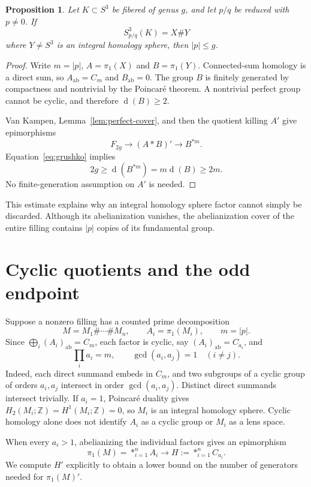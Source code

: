 \documentclass[11pt]{article}
\newtheorem{proposition}[theorem]{Proposition}
\theoremstyle{remark}
\newcommand{\Z}{\mathbb Z}
\newcommand{\ab}{\mathrm{ab}}
\newcommand{\gen}{\operatorname{d}}
\begin{document}
\begin{proposition}\label{prop:homology-sphere}
Let $K\subset S^3$ be fibered of genus $g$, and let $p/q$ be reduced with $p\ne0$. If
\[
 S^3_{p/q}(K)=X\#Y
\]
where $Y\ne S^3$ is an integral homology sphere, then $|p|\leq g$.
\end{proposition}
\begin{proof}
Write $m=|p|$, $A=\pi_1(X)$ and $B=\pi_1(Y)$. Connected-sum homology is a direct sum, so $A_{\ab}=C_m$ and $B_{\ab}=0$. The group $B$ is finitely generated by compactness and nontrivial by the Poincar\'e theorem. A nontrivial perfect group cannot be cyclic, and therefore $\gen(B)\geq2$.

Van Kampen, Lemma~\ref{lem:perfect-cover}, and then the quotient killing $A'$ give epimorphisms
\[
 F_{2g}\longrightarrow (A*B)'\longrightarrow B^{*m}.
\]
Equation~\eqref{eq:grushko} implies
\[
 2g\geq\gen(B^{*m})=m\gen(B)\geq2m.
\]
No finite-generation assumption on $A'$ is needed.
\end{proof}

This estimate explains why an integral homology sphere factor cannot simply be discarded. Although its abelianization vanishes, the abelianization cover of the entire filling contains $|p|$ copies of its fundamental group.

\section{Cyclic quotients and the odd endpoint}\label{sec:endpoint}

Suppose a nonzero filling has a counted prime decomposition
\begin{equation}\label{eq:sum}
 M=M_1\#\cdots\#M_n,
 \qquad A_i=\pi_1(M_i),\qquad m=|p|.
\end{equation}
Since $\bigoplus_i(A_i)_{\ab}=C_m$, each factor is cyclic, say $(A_i)_{\ab}=C_{a_i}$, and
\begin{equation}\label{eq:orders}
 \prod_i a_i=m,\qquad \gcd(a_i,a_j)=1\quad(i\ne j).
\end{equation}
Indeed, each direct summand embeds in $C_m$, and two subgroups of a cyclic group of orders $a_i,a_j$ intersect in order $\gcd(a_i,a_j)$. Distinct direct summands intersect trivially. If $a_i=1$, Poincar\'e duality gives $H_2(M_i;\Z)=H^1(M_i;\Z)=0$, so $M_i$ is an integral homology sphere. Cyclic homology alone does not identify $A_i$ as a cyclic group or $M_i$ as a lens space.

When every $a_i>1$, abelianizing the individual factors gives an epimorphism
\[
 \pi_1(M)=*_{i=1}^n A_i\longrightarrow H:=*_{i=1}^n C_{a_i}.
\]
We compute $H'$ explicitly to obtain a lower bound on the number of generators needed for $\pi_1(M)'$.
\end{document}
